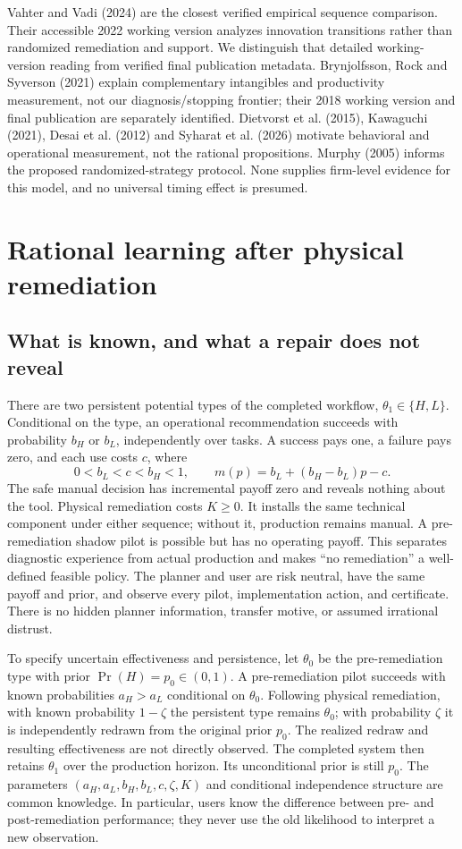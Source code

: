 \documentclass[11pt]{article}
\begin{document}
Vahter and Vadi (2024) are the closest verified empirical sequence comparison. Their accessible 2022 working version analyzes innovation transitions rather than randomized remediation and support. We distinguish that detailed working-version reading from verified final publication metadata. Brynjolfsson, Rock and Syverson (2021) explain complementary intangibles and productivity measurement, not our diagnosis/stopping frontier; their 2018 working version and final publication are separately identified. Dietvorst et al. (2015), Kawaguchi (2021), Desai et al. (2012) and Syharat et al. (2026) motivate behavioral and operational measurement, not the rational propositions. Murphy (2005) informs the proposed randomized-strategy protocol. None supplies firm-level evidence for this model, and no universal timing effect is presumed.

\section{Rational learning after physical remediation}\label{sec:rational}
\subsection{What is known, and what a repair does not reveal}
There are two persistent potential types of the completed workflow, $\theta_1\in\{H,L\}$. Conditional on the type, an operational recommendation succeeds with probability $b_H$ or $b_L$, independently over tasks. A success pays one, a failure pays zero, and each use costs $c$, where
\[
 0<b_L<c<b_H<1,\qquad m(p)=b_L+(b_H-b_L)p-c.
\]
The safe manual decision has incremental payoff zero and reveals nothing about the tool. Physical remediation costs $K\geq0$. It installs the same technical component under either sequence; without it, production remains manual. A pre-remediation shadow pilot is possible but has no operating payoff. This separates diagnostic experience from actual production and makes ``no remediation'' a well-defined feasible policy. The planner and user are risk neutral, have the same payoff and prior, and observe every pilot, implementation action, and certificate. There is no hidden planner information, transfer motive, or assumed irrational distrust.

To specify uncertain effectiveness and persistence, let $\theta_0$ be the pre-remediation type with prior $\Pr(H)=p_0\in(0,1)$. A pre-remediation pilot succeeds with known probabilities $a_H>a_L$ conditional on $\theta_0$. Following physical remediation, with known probability $1-\zeta$ the persistent type remains $\theta_0$; with probability $\zeta$ it is independently redrawn from the original prior $p_0$. The realized redraw and resulting effectiveness are not directly observed. The completed system then retains $\theta_1$ over the production horizon. Its unconditional prior is still $p_0$. The parameters $(a_H,a_L,b_H,b_L,c,\zeta,K)$ and conditional independence structure are common knowledge. In particular, users know the difference between pre- and post-remediation performance; they never use the old likelihood to interpret a new observation.
\end{document}
